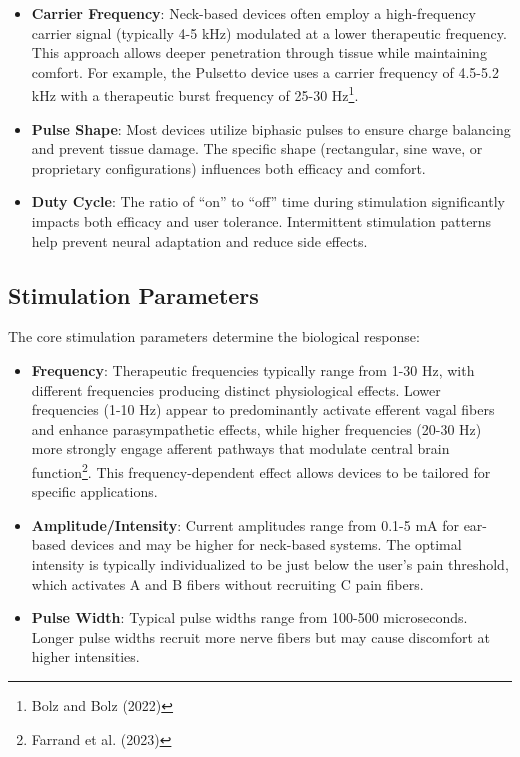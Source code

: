 \documentclass[
  Letterpaper,
]{scrbook}
\begin{document}
\begin{itemize}
\item
  \textbf{Carrier Frequency}: Neck-based devices often employ a
  high-frequency carrier signal (typically 4-5 kHz) modulated at a lower
  therapeutic frequency. This approach allows deeper penetration through
  tissue while maintaining comfort. For example, the Pulsetto device
  uses a carrier frequency of 4.5-5.2 kHz with a therapeutic burst
  frequency of 25-30 Hz\footnote{Bolz and Bolz (2022)}.
\item
  \textbf{Pulse Shape}: Most devices utilize biphasic pulses to ensure
  charge balancing and prevent tissue damage. The specific shape
  (rectangular, sine wave, or proprietary configurations) influences
  both efficacy and comfort.
\item
  \textbf{Duty Cycle}: The ratio of ``on'' to ``off'' time during
  stimulation significantly impacts both efficacy and user tolerance.
  Intermittent stimulation patterns help prevent neural adaptation and
  reduce side effects.
\end{itemize}

\subsection{Stimulation Parameters}\label{stimulation-parameters}

The core stimulation parameters determine the biological response:

\begin{itemize}
\item
  \textbf{Frequency}: Therapeutic frequencies typically range from 1-30
  Hz, with different frequencies producing distinct physiological
  effects. Lower frequencies (1-10 Hz) appear to predominantly activate
  efferent vagal fibers and enhance parasympathetic effects, while
  higher frequencies (20-30 Hz) more strongly engage afferent pathways
  that modulate central brain function\footnote{Farrand et al. (2023)}.
  This frequency-dependent effect allows devices to be tailored for
  specific applications.
\item
  \textbf{Amplitude/Intensity}: Current amplitudes range from 0.1-5 mA
  for ear-based devices and may be higher for neck-based systems. The
  optimal intensity is typically individualized to be just below the
  user's pain threshold, which activates A and B fibers without
  recruiting C pain fibers.
\item
  \textbf{Pulse Width}: Typical pulse widths range from 100-500
  microseconds. Longer pulse widths recruit more nerve fibers but may
  cause discomfort at higher intensities.
\end{itemize}
\end{document}
